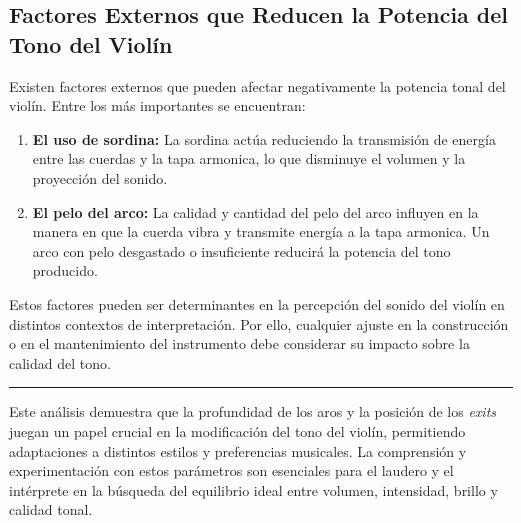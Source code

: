 \documentclass[12pt]{book}
\begin{document}
\subsection*{Factores Externos que Reducen la Potencia del Tono del Violín}

Existen factores externos que pueden afectar negativamente la potencia tonal del violín. Entre los más importantes se encuentran:

\begin{enumerate}
    \item \textbf{El uso de sordina:} La sordina actúa reduciendo la transmisión de energía entre las cuerdas y la tapa armonica, lo que disminuye el volumen y la proyección del sonido.
    
    \item \textbf{El pelo del arco:} La calidad y cantidad del pelo del arco influyen en la manera en que la cuerda vibra y transmite energía a la tapa armonica. Un arco con pelo desgastado o insuficiente reducirá la potencia del tono producido.
\end{enumerate}

Estos factores pueden ser determinantes en la percepción del sonido del violín en distintos contextos de interpretación. Por ello, cualquier ajuste en la construcción o en el mantenimiento del instrumento debe considerar su impacto sobre la calidad del tono.

\noindent\rule{8cm}{0.4pt}

Este análisis demuestra que la profundidad de los aros y la posición de los \textit{exits} juegan un papel crucial en la modificación del tono del violín, permitiendo adaptaciones a distintos estilos y preferencias musicales. La comprensión y experimentación con estos parámetros son esenciales para el laudero y el intérprete en la búsqueda del equilibrio ideal entre volumen, intensidad, brillo y calidad tonal.
\end{document}
